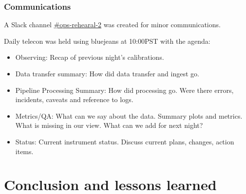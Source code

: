 \subsubsection{Communications }


A Slack channel \href{https://lsstc.slack.com/messages/CJBSY6FUN}{\#ops-rehearal-2} was created for minor communications.

Daily telecon was held using bluejeans at 10:00PST with the agenda:
\begin{itemize}
\item Observing: Recap of previous night's calibrations.
\item Data transfer summary:  How did data transfer and ingest go.
\item Pipeline Processing Summary: 	How did processing go.  Were there errors, incidents, caveats and reference to logs.
\item Metrics/QA:  What can we say about the data. Summary plots and metrics.  What is missing in our view. What can we add for next night?
\item Status:   Current instrument status.  Discuss current plans, changes, action items.

\end{itemize}







\section{Conclusion and lessons learned}\label{sec:conc}






